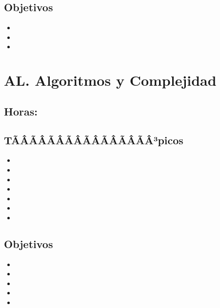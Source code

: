 \subsection*{Objetivos}
\begin{itemize}
	\item \PFCINCOObjUNO
	\item \PFCINCOObjDOS
	\item \PFCINCOObjTRES
\end{itemize}

\section{AL. Algoritmos y Complejidad}\label{sec:BOK-AL}

\subsection{\ALUNODef}\label{sec:BOK-AL1}
\subsection*{Horas: \ALUNOHours}

\subsection*{TÃÂÃÂÃÂÃÂÃÂÃÂÃÂÃÂ³picos}
\begin{itemize}
	\item \ALUNOTopicAnalisis
	\item \ALUNOTopicIdentificar
	\item \ALUNOTopicNotacion
	\item \ALUNOTopicClases
	\item \ALUNOTopicMedidas
	\item \ALUNOTopicCambios
	\item \ALUNOTopicUsar
\end{itemize}

\subsection*{Objetivos}
\begin{itemize}
	\item \ALUNOObjUNO
	\item \ALUNOObjDOS
	\item \ALUNOObjTRES
	\item \ALUNOObjCUATRO
	\item \ALUNOObjCINCO
\end{itemize}


